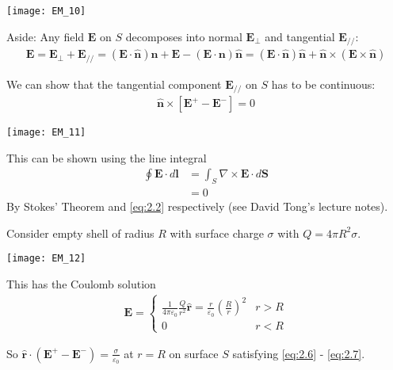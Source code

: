 \documentclass[a4paper]{article}
\begin{document}
\begin{eg}
\texttt{[image: EM\_10]}

Aside: Any field $\mathbf{E}$ on $S$ decomposes into normal $\mathbf{E}_\perp$ and tangential $\mathbf{E}_{//}$:
\begin{equation*}
\begin{aligned}
\mathbf{E} = \mathbf{E}_\perp + \mathbf{E}_{//} = (\mathbf{E} \cdot \mathbf{\hat{n}})\mathbf{\hat{n}} + \mathbf{E} - (\mathbf{E} \cdot \mathbf{n})\mathbf{\hat{n}} = (\mathbf{E} \cdot \mathbf{\hat{n}})\mathbf{\hat{n}} +\mathbf{\hat{n}} \times (\mathbf{E} \times \mathbf{\hat{n}})
\end{aligned}
\end{equation*}

We can show that the tangential component $\mathbf{E}_{//}$ on $S$ has to be continuous:
\begin{equation*}\tag{2.9} \label{eq:2.9}
\begin{aligned}
\mathbf{\hat{n}} \times [\mathbf{E}^+ - \mathbf{E}^-] = 0
\end{aligned}
\end{equation*}

\texttt{[image: EM\_11]}

This can be shown using the line integral
\begin{equation*}\tag{2.10} \label{eq:2.10}
\begin{aligned}
\oint \mathbf{E} \cdot d \mathbf{l} &= \int_S \nabla \times \mathbf{E} \cdot d \mathbf{S}\\
&= 0
\end{aligned}
\end{equation*}
By Stokes' Theorem and \eqref{eq:2.2} respectively (see David Tong's lecture notes).

\end{eg}

\begin{eg} 
Consider empty shell of radius $R$ with surface charge $\sigma$ with $Q = 4\pi R^2 \sigma$.

\texttt{[image: EM\_12]}

This has the Coulomb solution
\begin{equation*}
\begin{aligned}
\mathbf{E} = \left\{ \begin{array}{ll}
\frac{1}{4\pi \varepsilon_0}\frac{Q}{r^2} \mathbf{\hat{r}} = \frac{r}{\varepsilon_0}\left(\frac{R}{r}\right)^2 & r>R\\
0 & r<R
\end{array}\right.
\end{aligned}
\end{equation*}

So $\mathbf{\hat{r}} \cdot (\mathbf{E}^+ - \mathbf{E}^-) =\frac{\sigma}{\varepsilon_0}$ at $r=R$ on surface $S$ satisfying \eqref{eq:2.6} - \eqref{eq:2.7}.
\end{eg}
\end{document}
